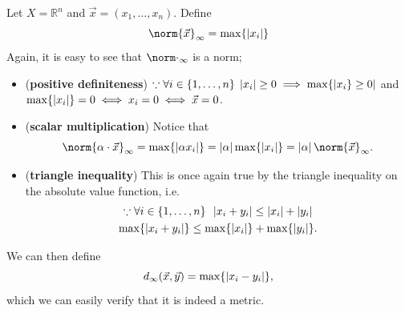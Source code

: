 \documentclass[notoc,notitlepage]{tufte-book}
\begin{document}
\begin{eg}
  Let $X = \mathbb{R}^n$ and $\vec{x} = ( x_1, \ldots, x_n )$. Define
  \begin{equation*}
    \norm{\vec{x}}_\infty = \max \{ \abs{x_i} \}
  \end{equation*}
  Again, it is easy to see that $\norm\cdot_\infty$ is a norm;
  \begin{itemize}
    \item (\textbf{positive definiteness}) $\because \forall i \in \{ 1, \ldots, n \} \; \left|x_i\right| \geq 0 \implies \max \{ \left|x_i \} \geq 0\right|$ and $\max \{ \left|x_i\right| \} = 0 \iff x_i = 0 \iff \vec{x} = 0$.
    \item (\textbf{scalar multiplication}) Notice that
      \begin{equation*}
        \norm{\alpha \cdot \vec{x}}_\infty = \max \{ \abs{\alpha x_i} \} = \abs{\alpha} \max \{ \abs{x_i} \} = \abs{\alpha} \norm{\vec{x}}_\infty.
      \end{equation*}
    \item (\textbf{triangle inequality}) This is once again true by the triangle inequality on the absolute value function, i.e.
      \begin{gather*}
        \because \forall i \in \{ 1, \ldots, n \} \enspace \left|x_i + y_i\right| \leq \left|x_i\right| + \left|y_i\right| \\
        \max \{ \left|x_i + y_i\right| \} \leq \max \{ \left|x_i\right| \} + \max \{ \left|y_i\right| \}.
      \end{gather*}
  \end{itemize}
  We can then define
  \begin{equation*}
    d_\infty(\vec{x}, \vec{y}) = \max \{ \left|x_i - y_i\right| \},
  \end{equation*}
  which we can easily verify that it is indeed a metric.
\end{eg}
\end{document}
